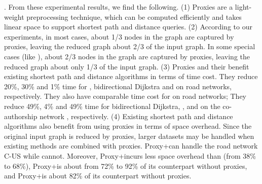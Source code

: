 \vspace{-0.5ex}
.
From these experimental results, we find the following. (1) Proxies are a light-weight preprocessing technique, which can be computed efficiently and takes linear space to support shortest path and distance queries.  (2) According to our experiments, in most cases, about 1/3 nodes in the graph are captured by proxies, leaving the reduced graph about 2/3 of the input graph. In some special cases (like \dblpone), about 2/3 nodes in the graph are captured by proxies, leaving the reduced graph about only 1/3 of the input graph. (3) Proxies and their \dras benefit existing shortest path and distance algorithms in terms of time cost. They reduce 20\%, 30\% and 1\% time for \arcflag, bidirectional Dijkstra and \ah on road networks, respectively. They also have comparable time cost for \tnr on road networks; They reduce 49\%, 4\% and 49\% time for bidirectional Dijkstra, \arcflag, and \tnr on the co-authorship network \dblpone, respectively. (4) Existing shortest path and distance algorithms also benefit from using proxies in terms of space overhead. Since the original input graph is reduced by proxies, larger datasets may be handled when existing methods are combined with proxies.  Proxy+\tnr can handle the road network C-US while \tnr cannot. Moreover, Proxy+\arcflag incurs less space overhead than \arcflag (from 38\% to 68\%), Proxy+\tnr is about from 72\% to 92\% of its counterpart without proxies, and Proxy+\ah is about 82\% of its counterpart without proxies.

